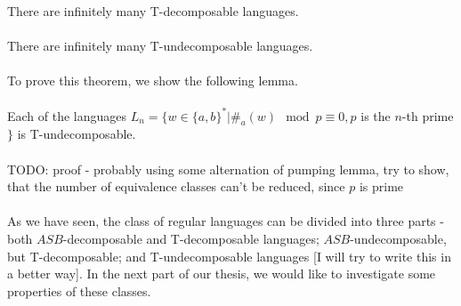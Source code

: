 \documentclass[12pt,oneside,a4paper]{book}
\begin{document}
\paragraph{}
\cdosledok There are infinitely many T-decomposable languages.

\paragraph{}
\cveta There are infinitely many T-undecomposable languages.

\paragraph{}
To prove this theorem, we show the following lemma.

\paragraph{}
\clema Each of the languages $L_{n} = \{ w \in \{ a, b\}^* | \#_{a}(w) \mod p \equiv 0, p$ is the $n$-th prime$\}$ is T-undecomposable.

\paragraph{}
\dokaz

\color{red}TODO: proof - probably using some alternation of pumping lemma, try to show, that the number of equivalence classes can't be reduced, since  $p$ is prime\color{black}\\
\square

\paragraph{}
As we have seen, the class of regular languages can be divided into three parts - both $ASB$-decomposable and T-decomposable languages; $ASB$-undecomposable, but T-decomposable; and T-undecomposable languages \color{red}[I will try to write this in a better way]\color{black}. In the next part of our thesis, we would like to investigate some properties of these classes.
\end{document}
